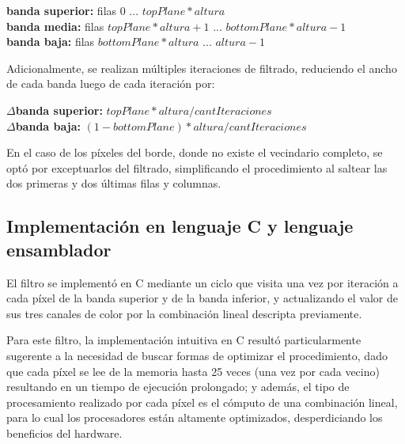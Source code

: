 \begin{center}
	\raggedright
	\hspace{100pt}\textbf{banda superior:} 	\hspace{10pt}filas 0 ... $topPlane * altura$\\
	\hspace{100pt}\textbf{banda media:} 		\hspace{22pt}filas $topPlane * altura + 1$ ... $bottomPlane * altura - 1$\\
	\hspace{100pt}\textbf{banda baja:} 		\hspace{31pt}filas $bottomPlane * altura$ ... $altura - 1$\\
\end{center}

Adicionalmente, se realizan múltiples iteraciones de filtrado, reduciendo el ancho de cada banda luego de cada iteración por:

\begin{center}
	\raggedright
	\hspace{100pt}$\Delta$\textbf{banda superior:} 	\hspace{10pt}$topPlane * altura / cantIteraciones$\\
	\hspace{100pt}$\Delta$\textbf{banda baja:} 		\hspace{31pt}$(1 - bottomPlane) * altura / cantIteraciones$\\
\end{center}

En el caso de los píxeles del borde, donde no existe el vecindario completo, se optó por exceptuarlos del filtrado, simplificando el procedimiento al saltear las dos primeras y dos últimas filas y columnas.

\subsection{Implementación en lenguaje C y lenguaje ensamblador}
\label{sub:miniature_implementaci_n_en_c}

El filtro se implementó en C mediante un ciclo que visita una vez por iteración a cada píxel de la banda superior y de la banda inferior, y actualizando el valor de sus tres canales de color por la combinación lineal descripta previamente.

Para este filtro, la implementación intuitiva en C resultó particularmente sugerente a la necesidad de buscar formas de optimizar el procedimiento, dado que cada píxel se lee de la memoria hasta 25 veces (una vez por cada vecino) resultando en un tiempo de ejecución prolongado; y además, el tipo de procesamiento realizado por cada píxel es el cómputo de una combinación lineal, para lo cual los procesadores están altamente optimizados, desperdiciando los beneficios del hardware.




